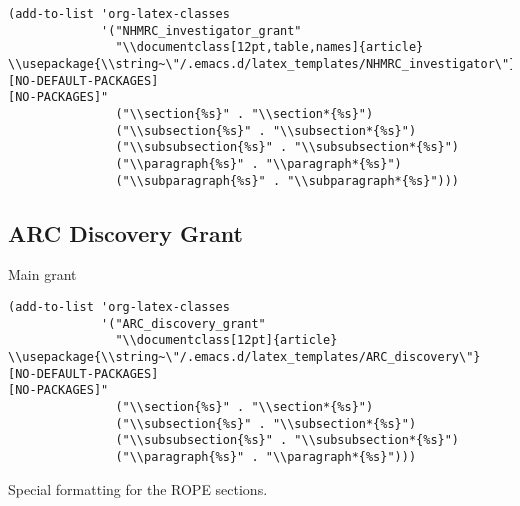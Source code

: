 \documentclass[12pt]{article}
\begin{document}
\begin{verbatim}
(add-to-list 'org-latex-classes
             '("NHMRC_investigator_grant"
               "\\documentclass[12pt,table,names]{article}
\\usepackage{\\string~\"/.emacs.d/latex_templates/NHMRC_investigator\"}
[NO-DEFAULT-PACKAGES]
[NO-PACKAGES]"
               ("\\section{%s}" . "\\section*{%s}")
               ("\\subsection{%s}" . "\\subsection*{%s}")
               ("\\subsubsection{%s}" . "\\subsubsection*{%s}")
               ("\\paragraph{%s}" . "\\paragraph*{%s}")
               ("\\subparagraph{%s}" . "\\subparagraph*{%s}")))
\end{verbatim}

\subsection{ARC Discovery Grant}
\label{sec:org47304dc}

Main grant 
\begin{verbatim}
(add-to-list 'org-latex-classes
             '("ARC_discovery_grant"
               "\\documentclass[12pt]{article}
\\usepackage{\\string~\"/.emacs.d/latex_templates/ARC_discovery\"}
[NO-DEFAULT-PACKAGES]
[NO-PACKAGES]"
               ("\\section{%s}" . "\\section*{%s}")
               ("\\subsection{%s}" . "\\subsection*{%s}")
               ("\\subsubsection{%s}" . "\\subsubsection*{%s}")
               ("\\paragraph{%s}" . "\\paragraph*{%s}")))
\end{verbatim}

Special formatting for the ROPE sections.
\end{document}
